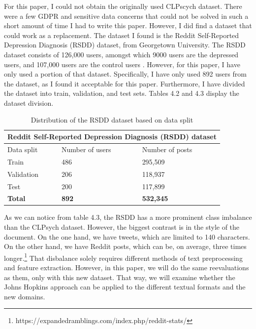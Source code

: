 \documentclass[times, utf8, seminar]{fer}
\begin{document}
For this paper, I could not obtain the originally used CLPscych dataset. There were a few GDPR and sensitive data concerns that could not be solved in such a short amount of time I had to write this paper. However, I did find a dataset that could work as a replacement. The dataset I found is the Reddit Self-Reported Depression Diagnosis (RSDD) dataset, from Georgetown University. The RSDD dataset consists of 126,000 users, amongst which 9000 users are the depressed users, and 107,000 users are the control users \citep{rsdd}. However, for this paper, I have only used a portion of that dataset. Specifically, I have only used 892 users from the dataset, as I found it acceptable for this paper. Furthermore, I have divided the dataset into train, validation, and test sets. Tables 4.2 and 4.3 display the dataset division.


\newpage

\begin{table}[h!]
	\centering
	\begin{tabular}{|p{3cm}|p{3cm}|p{3cm}|} 
		\hline
		\multicolumn{3}{|c|}{Reddit Self-Reported Depression Diagnosis (RSDD) dataset}\\
		\hline
		Data split & Number of users & Number of posts \\ [0.5ex] 
		\hline
		Train & 486 & 295,509 \\ 
		Validation  & 206 & 118,937 \\ 
		Test & 200 & 117,899  \\
		\hline
		\textbf{Total} & \textbf{892} & \textbf{532,345}\\
		\hline
	\end{tabular}
	\caption{Distribution of the RSDD dataset based on data split}
	\label{Table:1}
\end{table}

As we can notice from table 4.3, the RSDD has a more prominent class imbalance than the CLPsych dataset. However, the biggest contrast is in the style of the document. On the one hand, we have tweets, which are limited to 140 characters. On the other hand, we have Reddit posts, which can be, on average, three times longer.\footnote{https://expandedramblings.com/index.php/reddit-stats/} That disbalance solely requires different methods of text preprocessing and feature extraction. However, in this paper, we will do the same reevaluations as them, only with this new dataset. That way, we will examine whether the Johns Hopkins approach can be applied to the different textual formats and the new domains. \newline
\end{document}
